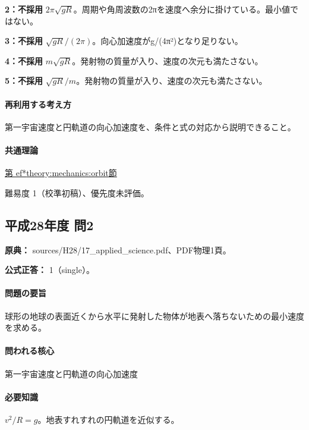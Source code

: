 \noindent\textbf{2：不採用} \(2\pi\sqrt{gR}\)。周期や角周波数の2πを速度へ余分に掛けている。最小値ではない。\par

\noindent\textbf{3：不採用} \(\sqrt{gR}/(2\pi)\)。向心加速度がg/(4π²)となり足りない。\par

\noindent\textbf{4：不採用} \(m\sqrt{gR}\)。発射物の質量が入り、速度の次元も満たさない。\par

\noindent\textbf{5：不採用} \(\sqrt{gR}/m\)。発射物の質量が入り、速度の次元も満たさない。\par

\paragraph{再利用する考え方} 第一宇宙速度と円軌道の向心加速度を、条件と式の対応から説明できること。

\paragraph{共通理論} \hyperref[theory:mechanics:orbit]{第
ef*{theory:mechanics:orbit}節}

\par 難易度 1（校準初稿）、優先度未評価。

\subsection{平成28年度 問2}
\label{q:h28-reg-applied-02}

\noindent\textbf{原典：} sources/H28/17\_applied\_science.pdf、PDF物理1頁。

\textbf{公式正答：} 1（single）。

\paragraph{問題の要旨} 球形の地球の表面近くから水平に発射した物体が地表へ落ちないための最小速度を求める。

\paragraph{問われる核心} 第一宇宙速度と円軌道の向心加速度

\paragraph{必要知識} \(v^2/R=g\)。地表すれすれの円軌道を近似する。

